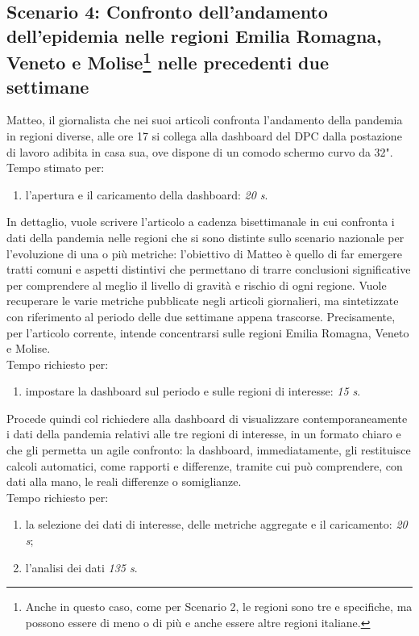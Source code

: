 \subsection[Scenario 4: Confronto dell'andamento dell'epidemia nelle regioni Emilia Romagna, Veneto e Molise nelle precedenti due settimane]{Scenario 4: Confronto dell'andamento dell'epidemia nelle regioni Emilia Romagna, Veneto e Molise\footnote{Anche in questo caso, come per Scenario 2, le regioni sono tre e specifiche, ma possono essere di meno o di più e anche essere altre regioni italiane.} nelle precedenti due settimane}
\label{ss:scenario-4}
Matteo, il giornalista che nei suoi articoli confronta l'andamento della pandemia in regioni diverse, alle ore 17 si collega alla dashboard del DPC dalla postazione di lavoro adibita in casa sua, ove dispone di un comodo schermo curvo da 32".\\
Tempo stimato per:
\begin{enumerate}
    \item l'apertura e il caricamento della dashboard: \textit{20 s}.
\end{enumerate}

\noindent
In dettaglio, vuole scrivere l'articolo a cadenza bisettimanale in cui confronta i dati della pandemia nelle  regioni che si sono distinte sullo scenario nazionale per l'evoluzione di una o più metriche: l'obiettivo di Matteo è quello di far emergere tratti comuni e aspetti distintivi che permettano di trarre conclusioni significative per comprendere al meglio il livello di gravità e rischio di ogni regione.
\noindent
Vuole recuperare le varie metriche pubblicate negli articoli giornalieri, ma sintetizzate con riferimento al periodo delle due settimane appena trascorse.
Precisamente, per l'articolo corrente, intende concentrarsi sulle regioni Emilia Romagna, Veneto e Molise.\\
Tempo richiesto per:
\begin{enumerate}
    \item impostare la dashboard sul periodo e sulle regioni di interesse: \textit{15 s}.
\end{enumerate}

\noindent
Procede quindi col richiedere alla dashboard di visualizzare contemporaneamente i dati della pandemia relativi alle tre regioni di interesse, in un formato chiaro e che gli permetta un agile confronto: la dashboard, immediatamente, gli restituisce calcoli automatici, come rapporti e differenze, tramite cui può comprendere, con dati alla mano, le reali differenze o somiglianze.\\
Tempo richiesto per:
\begin{enumerate}
    \item la selezione dei dati di interesse, delle metriche aggregate e il caricamento: \textit{20 s};
    \item l'analisi dei dati \textit{135 s}.
\end{enumerate}

